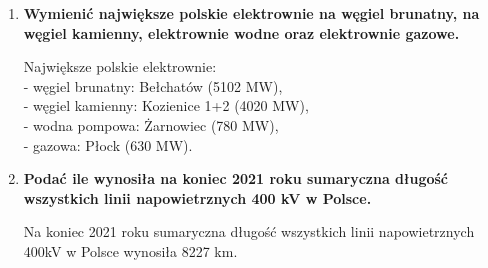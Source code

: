 \documentclass[12pt]{article}
\newcommand{\pytanie}[1]{\item \textbf{#1}}
\begin{document}
\begin{enumerate}
	\pytanie{Wymienić największe polskie elektrownie na węgiel brunatny, na węgiel kamienny, elektrownie wodne oraz elektrownie gazowe.}
	
	    Największe polskie elektrownie:\\
	    - węgiel brunatny: Bełchatów (5102 MW),\\
	    - węgiel kamienny: Kozienice 1+2 (4020 MW),\\
	    - wodna pompowa: Żarnowiec (780 MW),\\
	    - gazowa: Płock (630 MW).
	
	\pytanie{Podać ile wynosiła na koniec 2021 roku sumaryczna długość wszystkich linii napowietrznych 400 kV w Polsce.}
	
	    Na koniec 2021 roku sumaryczna długość wszystkich linii napowietrznych 400kV w Polsce wynosiła 8227 km.

\end{enumerate}

\newpage
\end{document}
